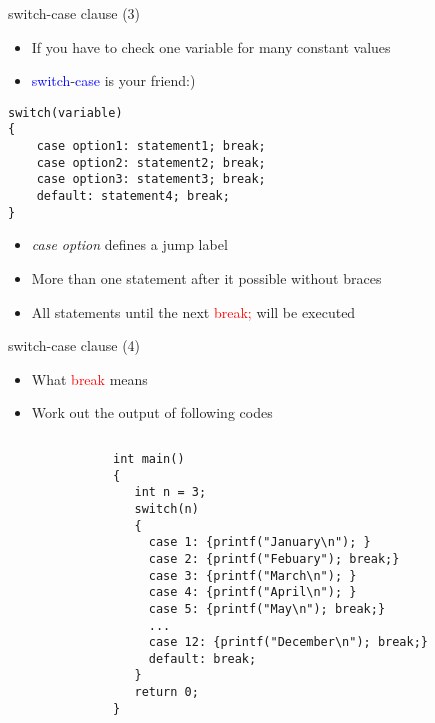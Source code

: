 \begin{frame}[fragile]{switch-case clause (3)}
\begin{itemize}
	\item {If you have to check one variable for many constant values}
	\item {\textcolor{blue}{switch}-\textcolor{blue}{case} is your friend:)}
\end{itemize}
	\begin{lstlisting}[numbers=none, basicstyle=\footnotesize]
switch(variable)
{
    case option1: statement1; break;
    case option2: statement2; break;
    case option3: statement3; break;
    default: statement4; break;
}
\end{lstlisting}
\begin{itemize}
	\item \textit{case option} defines a jump label
	\item More than one statement after it possible without braces
	\item All statements until the next \textcolor{red}{break;} will be executed
\end{itemize}	 
\end{frame}

\begin{frame}[fragile]{switch-case clause (4)}
\begin{itemize}
	\item {What \textcolor{red}{break} means}
	\item {Work out the output of following codes}
\end{itemize}
\vspace{-0.2in}
\begin{columns}
\begin{column}{0.1\linewidth}
\end{column}
\begin{column}{0.8\linewidth}
\begin{lstlisting}[numbers=none, basicstyle=\footnotesize]
int main()
{
   int n = 3;
   switch(n)
   {
     case 1: {printf("January\n"); }
     case 2: {printf("Febuary"); break;}
     case 3: {printf("March\n"); }
     case 4: {printf("April\n"); }
     case 5: {printf("May\n"); break;}
     ...
     case 12: {printf("December\n"); break;}
     default: break;
   }
   return 0;
}
\end{lstlisting}
\end{column}
\end{columns} 
\end{frame}


